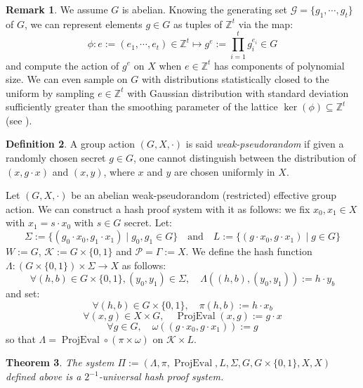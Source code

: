 \documentclass[a4paper,10pt]{report}
\theoremstyle{definition}
\newtheorem{definition}{Definition}[chapter]
\theoremstyle{plain}
\newtheorem{theorem}[definition]{Theorem}
\theoremstyle{definition}
\newtheorem{remark}[definition]{Remark}
\newcommand{\Z}{\mathbb{Z}}
\newcommand{\m}[1]{\mathcal{#1}}
\renewcommand{\(}{\left(}
\renewcommand{\)}{\right)}
\DeclareMathOperator{\ProjEval}{ProjEval}
\begin{document}
\begin{remark}\label{remark 3}
We assume $G$ is abelian. Knowing the generating set $\m{G}=\{g_1,\cdots, g_t\}$ of $G$,  we can represent elements $g\in G$ as tuples of $\Z^t$ via the map:
\[\phi : e:=(e_1,\cdots, e_t)\in\Z^t\longmapsto g^e:=\prod_{i=1}^t g_i^{e_i}\in G\]
and compute the action of $g^e$ on $X$ when $e\in\Z^t$ has components of polynomial size. We can even sample on $G$ with distributions statistically closed to the uniform by sampling $e\in \Z^t$ with Gaussian distribution with standard deviation sufficiently greater than the smoothing parameter of the lattice $\ker(\phi)\subseteq \Z^t$ (see \cite[sections 3 and 4]{MaccianoRegev}). 
\end{remark}

\begin{definition}
A group action $(G,X,\cdot)$ is said \emph{weak-pseudorandom} if given a randomly chosen secret $g\in G$, one cannot distinguish between the distribution of $(x,g\cdot x)$ and $(x, y)$, where $x$ and $y$ are chosen uniformly in $X$.
\end{definition}

Let $(G,X,\cdot)$ be an abelian weak-pseudorandom  (restricted) effective group action. We can construct a hash proof system with it as follows: we fix $x_0, x_1\in X$ with $x_1=s\cdot x_0$ with $s\in G$ secret. Let: 
\[\Sigma:=\{(g_0\cdot x_0,g_1\cdot x_1)\mid g_0, g_1\in G\}\quad \mbox{and} \quad L:=\{(g\cdot x_0,g\cdot x_1)\mid g\in G\}\]
$W:=G$, $\m{K}:=G\times\{0,1\}$ and $\m{P}=\Gamma:=X$.  We define the hash function $\Lambda : (G\times\{0,1\})\times\Sigma\longrightarrow X$ as follows:
\[\forall (h, b)\in G\times\{0,1\}, (y_0,y_1)\in \Sigma, \quad \Lambda((h,b),(y_0,y_1)):=h\cdot y_b\]
and set:
\[\forall (h, b)\in G\times\{0,1\}, \quad \pi(h,b):=h\cdot x_b\]
\[\forall (x,g)\in X\times G, \quad \ProjEval(x,g):=g\cdot x\]
\[\forall g\in G, \quad \omega((g\cdot x_0,g\cdot x_1)):=g\]
so that $\Lambda=\ProjEval\circ(\pi\times \omega)$ on $\m{K}\times L$.

\begin{theorem}\cite[theorem 1]{DeFeo1}\label{theorem 5}
The system $\Pi:=(\Lambda,\pi,\ProjEval,L,\Sigma,G,G\times\{0,1\},X,X)$ defined above is a $2^{-1}$-universal hash proof system.
\end{theorem}
\end{document}
